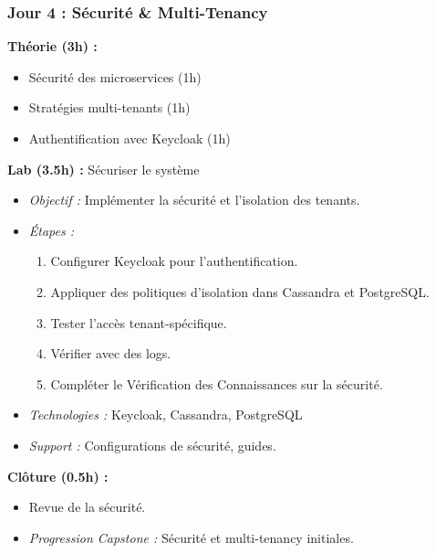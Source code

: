\documentclass[11pt]{article}
\begin{document}
\subsubsection{Jour 4 : Sécurité \& Multi-Tenancy}
\textbf{Théorie (3h) :}
\begin{itemize}
    \item Sécurité des microservices (1h)
    \item Stratégies multi-tenants (1h)
    \item Authentification avec Keycloak (1h)
\end{itemize}
\textbf{Lab (3.5h) :} Sécuriser le système
\begin{itemize}
    \item \textit{Objectif :} Implémenter la sécurité et l'isolation des tenants.
    \item \textit{Étapes :}
        \begin{enumerate}
            \item Configurer Keycloak pour l'authentification.
            \item Appliquer des politiques d'isolation dans Cassandra et PostgreSQL.
            \item Tester l'accès tenant-spécifique.
            \item Vérifier avec des logs.
            \item Compléter le Vérification des Connaissances sur la sécurité.
        \end{enumerate}
    \item \textit{Technologies :} Keycloak, Cassandra, PostgreSQL
    \item \textit{Support :} Configurations de sécurité, guides.
\end{itemize}
\textbf{Clôture (0.5h) :}
\begin{itemize}
    \item Revue de la sécurité.
    \item \textit{Progression Capstone :} Sécurité et multi-tenancy initiales.
\end{itemize}
\end{document}
